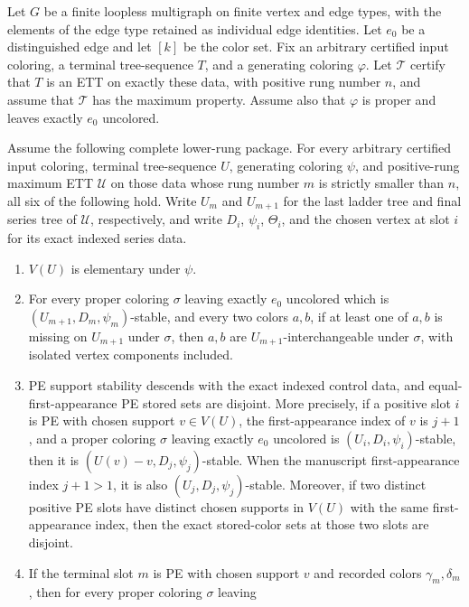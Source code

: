 \begin{lemma}
Let $G$ be a finite loopless multigraph on finite vertex and edge types,
with the elements of the edge type retained as individual edge identities.
Let $e_0$ be a distinguished edge and let $[k]$ be the color set.  Fix an
arbitrary certified input coloring, a terminal tree-sequence $T$, and a
generating coloring $\varphi$.  Let $\mathcal T$ certify that $T$ is an ETT
on exactly these data, with positive rung number $n$, and assume that
$\mathcal T$ has the maximum property.  Assume also that $\varphi$ is
proper and leaves exactly $e_0$ uncolored.

Assume the following complete lower-rung package.  For every arbitrary
certified input coloring, terminal tree-sequence $U$, generating coloring
$\psi$, and positive-rung maximum ETT $\mathcal U$ on those data whose rung
number $m$ is strictly smaller than $n$, all six of the following hold.
Write $U_m$ and $U_{m+1}$ for the last ladder tree and final series tree of
$\mathcal U$, respectively, and write $D_i$, $\psi_i$, $\Theta_i$, and the
chosen vertex at slot $i$ for its exact indexed series data.
\begin{enumerate}
\item $V(U)$ is elementary under $\psi$.
\item For every proper coloring $\sigma$ leaving exactly $e_0$ uncolored
which is $(U_{m+1},D_m,\psi_m)$-stable, and every two colors $a,b$, if at
least one of $a,b$ is missing on $U_{m+1}$ under $\sigma$, then $a,b$ are
$U_{m+1}$-interchangeable under $\sigma$, with isolated vertex components
included.
\item PE support stability descends with the exact indexed control data,
and equal-first-appearance PE stored sets are disjoint.  More precisely,
if a positive slot $i$ is PE with chosen support $v\in V(U)$, the
first-appearance index of $v$ is $j+1$, and a proper coloring $\sigma$
leaving exactly $e_0$ uncolored is $(U_i,D_i,\psi_i)$-stable, then it is
$(U(v)-v,D_j,\psi_j)$-stable.  When the manuscript first-appearance
index $j+1>1$, it is also $(U_j,D_j,\psi_j)$-stable.  Moreover,
if two distinct positive PE slots have distinct chosen supports in $V(U)$
with the same first-appearance index, then the exact stored-color sets at
those two slots are disjoint.
\item If the terminal slot $m$ is PE with chosen support $v$ and recorded
colors $\gamma_m,\delta_m$, then for every proper coloring $\sigma$ leaving

\end{enumerate}
\end{lemma}
